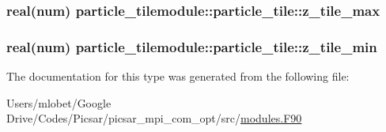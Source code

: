 \subsubsection[{\texorpdfstring{z\+\_\+tile\+\_\+max}{z_tile_max}}]{\setlength{\rightskip}{0pt plus 5cm}real(num) particle\+\_\+tilemodule\+::particle\+\_\+tile\+::z\+\_\+tile\+\_\+max}\hypertarget{structparticle__tilemodule_1_1particle__tile_afca3fd855860c9f358beb141b5f3678e}{}\label{structparticle__tilemodule_1_1particle__tile_afca3fd855860c9f358beb141b5f3678e}
\subsubsection[{\texorpdfstring{z\+\_\+tile\+\_\+min}{z_tile_min}}]{\setlength{\rightskip}{0pt plus 5cm}real(num) particle\+\_\+tilemodule\+::particle\+\_\+tile\+::z\+\_\+tile\+\_\+min}\hypertarget{structparticle__tilemodule_1_1particle__tile_aaec77c84caad0d4d64c351f664a86ca4}{}\label{structparticle__tilemodule_1_1particle__tile_aaec77c84caad0d4d64c351f664a86ca4}


The documentation for this type was generated from the following file\+:\begin{DoxyCompactItemize}
\item 
Users/mlobet/\+Google Drive/\+Codes/\+Picsar/picsar\+\_\+mpi\+\_\+com\+\_\+opt/src/\hyperlink{modules_8_f90}{modules.\+F90}\end{DoxyCompactItemize}
